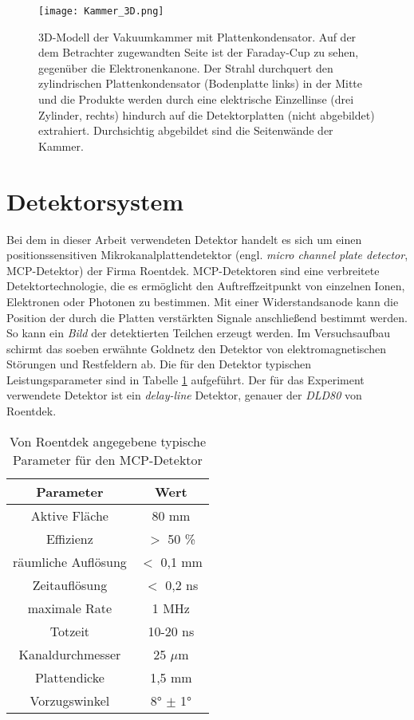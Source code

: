 \begin{figure}
    \centering
    \hspace{-2.8cm}\texttt{[image: Kammer\_3D.png]}
    \caption[3D-Modell der Vakuumkammer mit Plattenkondensator]{3D-Modell der Vakuumkammer mit Plattenkondensator. Auf der dem Betrachter zugewandten Seite ist der Faraday-Cup zu sehen, gegenüber die Elektronenkanone. Der Strahl durchquert den zylindrischen Plattenkondensator (Bodenplatte links) in der Mitte und die Produkte werden durch eine elektrische Einzellinse (drei Zylinder, rechts) hindurch auf die Detektorplatten (nicht abgebildet) extrahiert. Durchsichtig abgebildet sind die Seitenwände der Kammer.}
    \label{fig:3D}
\end{figure}

\section{Detektorsystem}
Bei dem in dieser Arbeit verwendeten Detektor handelt es sich um einen positionssensitiven Mikrokanalplattendetektor (engl. \textit{micro channel plate detector}, MCP-Detektor) der Firma Roentdek. MCP-Detektoren sind eine verbreitete Detektortechnologie, die es ermöglicht den Auftreffzeitpunkt von einzelnen Ionen, Elektronen oder Photonen zu bestimmen. Mit einer Widerstandsanode kann die Position der durch die Platten verstärkten Signale anschließend bestimmt werden. So kann ein \textit{Bild} der detektierten Teilchen erzeugt werden. Im Versuchsaufbau schirmt das soeben erwähnte Goldnetz den Detektor von elektromagnetischen Störungen und Restfeldern ab. Die für den Detektor typischen Leistungsparameter sind in Tabelle \ref{tab:MCP} aufgeführt. Der für das Experiment verwendete Detektor ist ein \textit{delay-line} Detektor, genauer der \textit{DLD80} von Roentdek.

\begin{table}[h]
    \centering
    \caption{Von Roentdek angegebene typische Parameter für den MCP-Detektor}
    \begin{tabular}{c|c}
        Parameter & Wert \\
        \hline
        Aktive Fläche & 80 mm \\
        Effizienz & $>$ 50 \% \\
        räumliche Auflösung & $<$ 0,1 mm \\
        Zeitauflösung & $<$ 0,2 ns \\
        maximale Rate & 1 MHz \\
        Totzeit & 10-20 ns \\
        Kanaldurchmesser & 25 $\mu$m \\
        Plattendicke & 1,5 mm \\
        Vorzugswinkel & \ang{8} $\pm$ \ang{1} \\

    \end{tabular}
    \label{tab:MCP}
\end{table}

